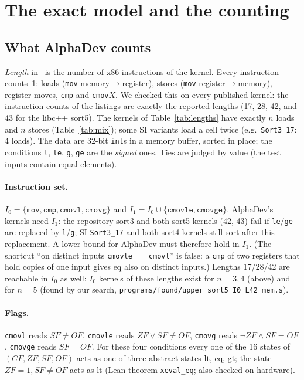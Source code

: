\section{The exact model and the counting}\label{sec:model}

\subsection{What AlphaDev counts}
\emph{Length} in~\cite{alphadev} is the number of x86 instructions of the kernel. Every instruction counts~1: loads
(\texttt{mov} memory$\to$register), stores (\texttt{mov} register$\to$memory), register moves, \texttt{cmp} and
\texttt{cmov}$X$. We checked this on every published kernel: the instruction counts of the listings are exactly the reported
lengths (17, 28, 42, and 43 for the libc++ sort5). The kernels of Table~\ref{tab:lengths} have exactly $n$ loads and $n$
stores (Table~\ref{tab:mix}); some SI variants load a cell twice (e.g.\ \texttt{Sort3\_17}: 4 loads). The data are 32-bit \texttt{int}s in a memory buffer, sorted in place; the conditions
\texttt{l}, \texttt{le}, \texttt{g}, \texttt{ge} are the \emph{signed} ones. Ties are judged by value (the test inputs
contain equal elements).

\paragraph{Instruction set.} $I_0 = \{\texttt{mov}, \texttt{cmp}, \texttt{cmovl}, \texttt{cmovg}\}$ and
$I_1 = I_0 \cup \{\texttt{cmovle}, \texttt{cmovge}\}$. AlphaDev's kernels need $I_1$: the repository sort3 and both sort5
kernels (42, 43) fail if \texttt{le}/\texttt{ge} are replaced by \texttt{l}/\texttt{g}; SI \texttt{Sort3\_17} and both
sort4 kernels still sort after this replacement. A lower bound for AlphaDev must therefore hold in $I_1$. (The shortcut
``on distinct inputs \texttt{cmovle} $=$ \texttt{cmovl}'' is false: a \texttt{cmp} of two registers that hold copies of one
input gives \textsf{eq} also on distinct inputs.) Lengths 17/28/42 are reachable in $I_0$ as well: $I_0$ kernels of these
lengths exist for $n = 3, 4$ (above) and for $n = 5$ (found by our search, \texttt{programs/found/upper\_sort5\_I0\_L42\_mem.s}).

\paragraph{Flags.} \texttt{cmovl} reads $SF \ne OF$, \texttt{cmovle} reads $ZF \lor SF \ne OF$, \texttt{cmovg} reads
$\lnot ZF \land SF = OF$, \texttt{cmovge} reads $SF = OF$. For these four conditions every one of the 16 states of
$(CF, ZF, SF, OF)$ acts as one of three abstract states \textsf{lt}, \textsf{eq}, \textsf{gt}; the state $ZF = 1, SF \ne OF$
acts as \textsf{lt} (Lean theorem \texttt{xeval\_eq}; also checked on hardware).


